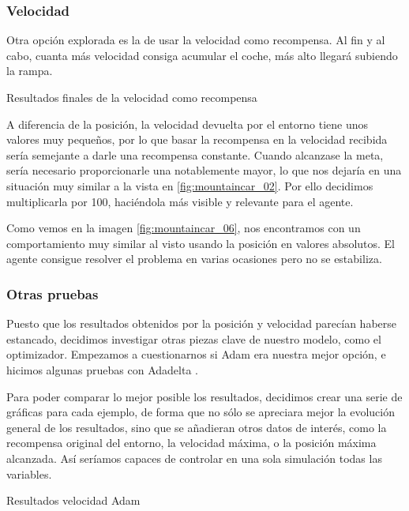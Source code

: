 \subsubsection*{Velocidad}

Otra opción explorada es la de usar la velocidad como recompensa. Al fin y al cabo, cuanta más velocidad consiga acumular el coche, más alto llegará subiendo la rampa.

%
       {Resultados finales de la velocidad como recompensa}

A diferencia de la posición, la velocidad devuelta por el entorno tiene unos valores muy pequeños, por lo que basar la recompensa en la velocidad recibida sería semejante a darle una recompensa constante. Cuando alcanzase la meta, sería necesario proporcionarle una notablemente mayor, lo que nos dejaría en una situación muy similar a la vista en \ref{fig:mountaincar_02}. Por ello decidimos multiplicarla por 100, haciéndola más visible y relevante para el agente. 

Como vemos en la imagen \ref{fig:mountaincar_06}, nos encontramos con un comportamiento muy similar al visto usando la posición en valores absolutos. El agente consigue resolver el problema en varias ocasiones pero no se estabiliza.

\subsubsection*{Otras pruebas}

Puesto que los resultados obtenidos por la posición y velocidad parecían haberse estancado, decidimos investigar otras piezas clave de nuestro modelo, como el optimizador. Empezamos a cuestionarnos si Adam \citep{kingma2014adam} era nuestra mejor opción, e hicimos algunas pruebas con Adadelta \citep{NIPS2017_7003}.

Para poder comparar lo mejor posible los resultados, decidimos crear una serie de gráficas para cada ejemplo, de forma que no sólo se apreciara mejor la evolución general de los resultados, sino que se añadieran otros datos de interés, como la recompensa original del entorno, la velocidad máxima, o la posición máxima alcanzada. Así seríamos capaces de controlar en una sola simulación todas las variables.

%
       {Resultados velocidad Adam}

